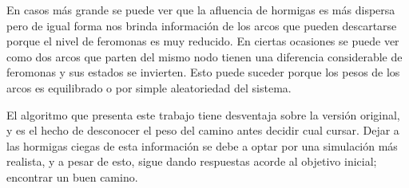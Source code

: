 \documentclass[
12pt, %
letterpaper, %
oneside, %
headinclude,footinclude, %
BCOR5mm, %
]{scrartcl}
\begin{document}
En casos más grande se puede ver que la afluencia de hormigas es más dispersa pero de igual forma nos brinda información de los arcos que pueden descartarse porque el nivel de feromonas es muy reducido. En ciertas ocasiones se puede ver como dos arcos que parten del mismo nodo tienen una diferencia considerable de feromonas y sus estados se invierten. Esto puede suceder porque los pesos de los arcos es equilibrado o por simple aleatoriedad del sistema.

El algoritmo que presenta este trabajo tiene desventaja sobre la versión original, y es el hecho de desconocer el peso del camino antes decidir cual cursar. Dejar a las hormigas ciegas de esta información se debe a optar por una simulación más realista, y a pesar de esto, sigue dando respuestas acorde al objetivo inicial; encontrar un buen camino.





\newpage

\renewcommand{\refname}{\spacedlowsmallcaps{Referencias}} %




\end{document}
